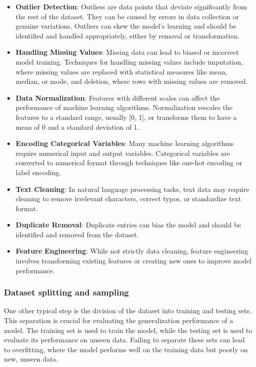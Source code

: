     \begin{itemize}
        \item \textbf{Outlier Detection}: Outliers are data points that deviate significantly from the rest of the dataset. They can be caused by errors in data collection or genuine variations. Outliers can skew the model's learning and should be identified and handled appropriately, either by removal or transformation.
        
        \item \textbf{Handling Missing Values}: Missing data can lead to biased or incorrect model training. Techniques for handling missing values include imputation, where missing values are replaced with statistical measures like mean, median, or mode, and deletion, where rows with missing values are removed.
        
        \item \textbf{Data Normalization}: Features with different scales can affect the performance of machine learning algorithms. Normalization rescales the features to a standard range, usually [0, 1], or transforms them to have a mean of 0 and a standard deviation of 1.
        
        \item \textbf{Encoding Categorical Variables}: Many machine learning algorithms require numerical input and output variables. Categorical variables are converted to numerical format through techniques like one-hot encoding or label encoding.
        
        \item \textbf{Text Cleaning}: In natural language processing tasks, text data may require cleaning to remove irrelevant characters, correct typos, or standardize text format.
        
        \item \textbf{Duplicate Removal}: Duplicate entries can bias the model and should be identified and removed from the dataset.
        
        \item \textbf{Feature Engineering}: While not strictly data cleaning, feature engineering involves transforming existing features or creating new ones to improve model performance.
    \end{itemize}

    \subsubsection{Dataset splitting and sampling}
    One other typical step is the division of the dataset into training and testing sets. This separation is crucial for evaluating the generalization performance of a model. The training set is used to train the model, while the testing set is used to evaluate its performance on unseen data. Failing to separate these sets can lead to overfitting, where the model performs well on the training data but poorly on new, unseen data.

